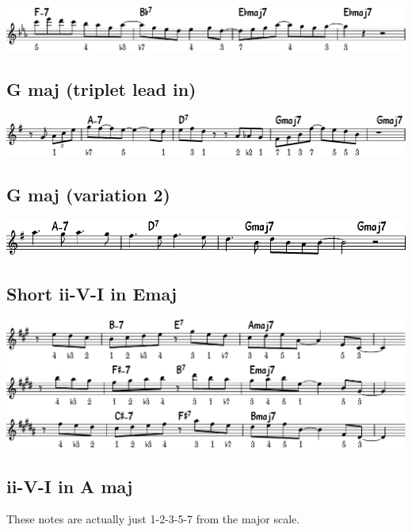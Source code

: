 \documentclass[11pt]{article}
\begin{document}
\begin{center}
\includegraphics[width=.98\linewidth]{e-flat.pdf}
\end{center}

\subsection{G maj (triplet lead in)}
\label{sec:org81b2040}
\begin{center}
\includegraphics[width=.98\linewidth]{g_maj.pdf}
\end{center}

\subsection{G maj (variation 2)}
\label{sec:orgdc2ce49}
\begin{center}
\includegraphics[width=.98\linewidth]{g_maj_v2.pdf}
\end{center}

\subsection{Short ii-V-I in Emaj}
\label{sec:orgdba970a}
\begin{center}
\includegraphics[width=.98\linewidth]{short-ii-v-in-Emaj.pdf}
\end{center}

\subsection{ii-V-I in A maj}
\label{sec:orgb8513ce}
These notes are actually just 1-2-3-5-7 from the major scale.
\end{document}
